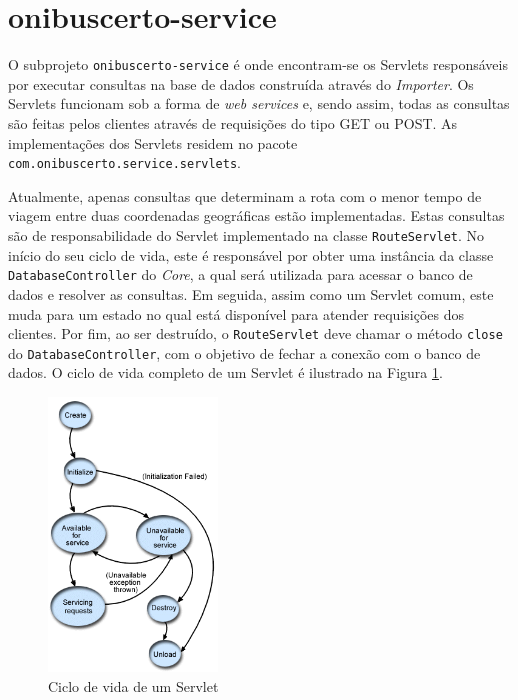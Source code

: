 \section{onibuscerto-service}

O subprojeto \texttt{onibuscerto-service} é onde encontram-se os Servlets responsáveis por executar consultas na base de dados construída através do \emph{Importer}.
Os Servlets funcionam sob a forma de \emph{web services} e, sendo assim, todas as consultas são feitas pelos clientes através de requisições  do tipo GET ou POST.
As implementações dos Servlets residem no pacote \texttt{com.onibuscerto.service.servlets}.

Atualmente, apenas consultas que determinam a rota com o menor tempo de viagem entre duas coordenadas geográficas estão implementadas.
Estas consultas são de responsabilidade do Servlet implementado na classe \texttt{RouteServlet}.
No início do seu ciclo de vida, este é responsável por obter uma instância da classe \texttt{DatabaseController} do \emph{Core}, a qual será utilizada para acessar o banco de dados e resolver as consultas.
Em seguida, assim como um Servlet comum, este muda para um estado no qual está disponível para atender requisições dos clientes.
Por fim, ao ser destruído, o \texttt{RouteServlet} deve chamar o método \texttt{close} do \texttt{DatabaseController}, com o objetivo de fechar a conexão com o banco de dados.
O ciclo de vida completo de um Servlet é ilustrado na Figura \ref{fig:servletciclo}.

\begin{figure}[!htb]
	\centering
	\includegraphics[width=0.4\textwidth]{./imgs/servletciclo.png}
	\caption[Ciclo de vida de um Servlet]{Ciclo de vida de um Servlet}
	\label{fig:servletciclo}
\end{figure}

